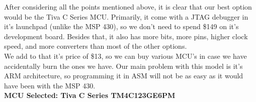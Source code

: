 After considering all the points mentioned above, it is clear that our best option would be the Tiva C Series MCU. Primarily, it come with a JTAG debugger in it's launchpad (unlike the MSP 430), so we don't need to spend \$149 on it's development board. Besides that, it also has more bits, more pins, higher clock speed, and more converters than most of the other options. \\

We add to that it's price of \$13, so we can buy various MCU's in case we have accidentally burn the ones we have. Our main problem with this model is it's ARM architecture, so programming it in ASM will not be as easy as it would have been with the MSP 430. \\

\textbf{MCU Selected: Tiva C Series TM4C123GE6PM}



\newpage




